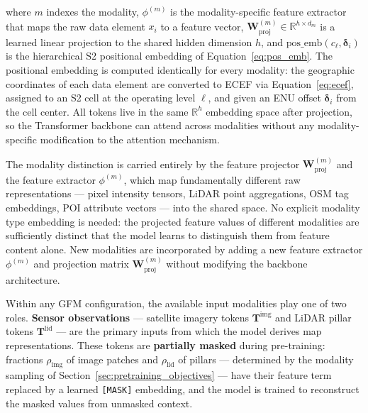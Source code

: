 \documentclass{book}
\begin{document}
where $m$ indexes the modality, $\phi^{(m)}$ is the
modality-specific feature extractor that maps the raw data element
$x_i$ to a feature vector, $\mathbf{W}^{(m)}_{\text{proj}} \in
\mathbb{R}^{h \times d_m}$ is a learned linear projection to the
shared hidden dimension $h$, and $\text{pos\_emb}(c_\ell,
\boldsymbol{\delta}_i)$ is the hierarchical S2 positional embedding
of Equation~\eqref{eq:pos_emb}.  The positional embedding is
computed identically for every modality: the geographic coordinates
of each data element are converted to ECEF via
Equation~\eqref{eq:ecef}, assigned to an S2 cell at the operating
level $\ell$, and given an ENU offset $\boldsymbol{\delta}_i$ from
the cell center.  All tokens live in the same $\mathbb{R}^h$
embedding space after projection, so the Transformer backbone can
attend across modalities without any modality-specific modification
to the attention mechanism.

The modality distinction is carried entirely by the feature
projector $\mathbf{W}^{(m)}_{\text{proj}}$ and the feature
extractor $\phi^{(m)}$, which map fundamentally different raw
representations --- pixel intensity tensors, LiDAR point
aggregations, OSM tag embeddings, POI attribute vectors --- into
the shared space.  No explicit modality type embedding is needed:
the projected feature values of different modalities are
sufficiently distinct that the model learns to distinguish them
from feature content alone.  New modalities are incorporated
by adding a new feature extractor $\phi^{(m)}$ and projection
matrix $\mathbf{W}^{(m)}_{\text{proj}}$ without modifying the
backbone architecture.

Within any GFM configuration, the available input modalities play
one of two roles.  \textbf{Sensor observations} --- satellite
imagery tokens $\mathbf{T}^{\text{img}}$ and LiDAR pillar tokens
$\mathbf{T}^{\text{lid}}$ --- are the primary inputs from which
the model derives map representations.  These tokens are
\textbf{partially masked} during pre-training: fractions
$\rho_{\text{img}}$ of image patches and $\rho_{\text{lid}}$ of
pillars --- determined by the modality sampling of
Section~\ref{sec:pretraining_objectives} --- have their feature
term replaced by a learned \texttt{[MASK]} embedding, and the
model is trained to reconstruct the masked values from unmasked
context.
\end{document}
